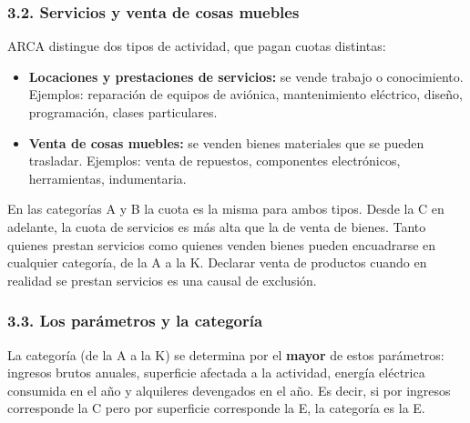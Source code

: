 \subsubsection*{3.2. Servicios y venta de cosas muebles}
ARCA distingue dos tipos de actividad, que pagan cuotas distintas:
\begin{itemize}
  \item \textbf{Locaciones y prestaciones de servicios:} se vende trabajo o conocimiento.
        Ejemplos: reparación de equipos de aviónica, mantenimiento eléctrico, diseño,
        programación, clases particulares.
  \item \textbf{Venta de cosas muebles:} se venden bienes materiales que se pueden trasladar.
        Ejemplos: venta de repuestos, componentes electrónicos, herramientas, indumentaria.
\end{itemize}
En las categorías A y B la cuota es la misma para ambos tipos. Desde la C en adelante, la
cuota de servicios es más alta que la de venta de bienes. Tanto quienes prestan servicios
como quienes venden bienes pueden encuadrarse en cualquier categoría, de la A a la K.
Declarar venta de productos cuando en realidad se prestan servicios es una causal de
exclusión.

\subsubsection*{3.3. Los parámetros y la categoría}
La categoría (de la A a la K) se determina por el \textbf{mayor} de estos parámetros:
ingresos brutos anuales, superficie afectada a la actividad, energía eléctrica consumida
en el año y alquileres devengados en el año. Es decir, si por ingresos corresponde la C pero
por superficie corresponde la E, la categoría es la E.

